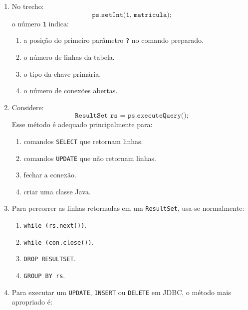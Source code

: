 \documentclass[12pt,a4paper]{article}
\begin{document}
\begin{enumerate}[resume,label=\textbf{Q\arabic*.}]
\begin{enumerate}[label=\alph*)]
    \item um parâmetro a ser ligado antes da execução.
    \item um erro obrigatório de sintaxe.
    \item uma coluna chamada interrogação.
    \item um comando para apagar a tabela.
\end{enumerate}

\item No trecho:
\[
\texttt{ps.setInt(1, matricula);}
\]
o número \texttt{1} indica:

\begin{enumerate}[label=\alph*)]
    \item a posição do primeiro parâmetro \texttt{?} no comando preparado.
    \item o número de linhas da tabela.
    \item o tipo da chave primária.
    \item o número de conexões abertas.
\end{enumerate}

\item Considere:
\[
\texttt{ResultSet rs = ps.executeQuery();}
\]
Esse método é adequado principalmente para:

\begin{enumerate}[label=\alph*)]
    \item comandos \texttt{SELECT} que retornam linhas.
    \item comandos \texttt{UPDATE} que não retornam linhas.
    \item fechar a conexão.
    \item criar uma classe Java.
\end{enumerate}

\item Para percorrer as linhas retornadas em um \texttt{ResultSet}, usa-se normalmente:

\begin{enumerate}[label=\alph*)]
    \item \texttt{while (rs.next())}.
    \item \texttt{while (con.close())}.
    \item \texttt{DROP RESULTSET}.
    \item \texttt{GROUP BY rs}.
\end{enumerate}

\item Para executar um \texttt{UPDATE}, \texttt{INSERT} ou \texttt{DELETE} em JDBC, o método mais apropriado é:


\end{enumerate}
\end{document}
